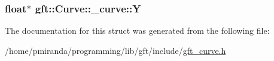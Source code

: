 \subsubsection[{\texorpdfstring{Y}{Y}}]{\setlength{\rightskip}{0pt plus 5cm}float$\ast$ gft\+::\+Curve\+::\+\_\+curve\+::Y}\hypertarget{structgft_1_1Curve_1_1__curve_a41af9aa85ad177abd58f933208fc90b7}{}\label{structgft_1_1Curve_1_1__curve_a41af9aa85ad177abd58f933208fc90b7}


The documentation for this struct was generated from the following file\+:\begin{DoxyCompactItemize}
\item 
/home/pmiranda/programming/lib/gft/include/\hyperlink{gft__curve_8h}{gft\+\_\+curve.\+h}\end{DoxyCompactItemize}
